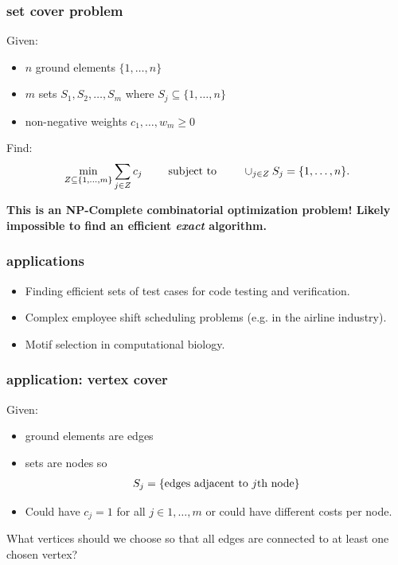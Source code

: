 \documentclass[compress]{beamer}
\begin{document}
\begin{frame}
	\frametitle{set cover problem}	
	Given:
	\begin{itemize}
		\item $n$ ground elements $\{1,\ldots,n\}$
		\item $m$ sets $S_1,S_2,\ldots,S_m$ where $S_j \subseteq \{1,\ldots,n\}$
		\item non-negative weights $c_1, \ldots, w_m\geq 0$
	\end{itemize}
	
	\vspace{2em}
	
	Find:
	\begin{align*}
		\min_{Z \subseteq \{1,\ldots,m\}}
		\sum_{j \in Z} c_j
		\hspace{2em}
		\textnormal{ subject to }
		\hspace{2em}
		\cup_{j \in Z} S_j = \{1,\ldots,n\}.
	\end{align*}

\begin{center}
\textbf{\alert{This is an NP-Complete combinatorial optimization problem! Likely impossible to find an efficient \emph{exact} algorithm.}}
\end{center}
\end{frame}

\begin{frame}
	\frametitle{applications}
	\begin{itemize}
		\item Finding efficient sets of test cases for code testing and verification.
		\item Complex employee shift scheduling problems (e.g. in the airline industry).
		\item Motif selection in computational biology.
	\end{itemize}
\end{frame}

\begin{frame}
	\frametitle{application: vertex cover}
	
	Given:
	\begin{itemize}
		\item ground elements are edges
		\item sets are nodes so
		\begin{align*}
			S_j = \{ \textnormal{edges adjacent to
				$j$th node}\}
		\end{align*}
		\item Could have $c_j=1$ for all $j\in 1, \ldots, m$ or could have different costs per node.
	\end{itemize}
	\vspace{2em}
	
	What vertices should we choose so that all
	edges are connected to at least one chosen
	vertex?
\end{frame}
\end{document}
